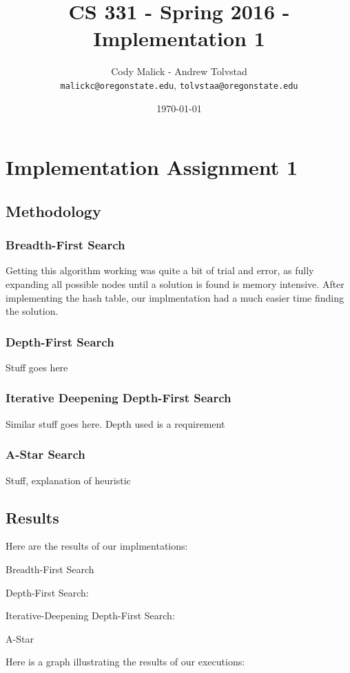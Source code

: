 \documentclass[10pt,letterpaper]{article}
\begin{document}
\begin{titlepage}
  \title{CS 331 - Spring 2016 - Implementation 1}
  \author{Cody Malick - Andrew Tolvstad\\
  \texttt{malickc@oregonstate.edu}, \texttt{tolvstaa@oregonstate.edu}}
  \date{\today}
  \maketitle
  \vspace*{2cm}

\end{titlepage}

\section{Implementation Assignment 1}
	\subsection{Methodology}
	\subsubsection{Breadth-First Search}

Getting this algorithm working was quite a bit of trial and error, as fully expanding all possible nodes until a solution is found is memory intensive. After implementing the hash table, our implmentation had a much easier time finding the solution.

	\subsubsection{Depth-First Search}
Stuff goes here

	\subsubsection{Iterative Deepening Depth-First Search}

	Similar stuff goes here.
	Depth used is a requirement

	\subsubsection{A-Star Search}
Stuff, explanation of heuristic

  \subsection{Results}
  Here are the results of our implmentations:
  \begin{description}
	  \item Breadth-First Search
	  \item Depth-First Search:
	  \item Iterative-Deepening Depth-First Search:
	  \item A-Star
  \end{description}
	Here is a graph illustrating the results of our executions:
\end{document}
